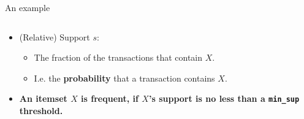 \documentclass[aspectratio=169,t]{beamer}
\begin{document}
{\begin{frame}{An example}
\begin{columns}
\begin{column}{0.5\textwidth}
\begin{itemize}
            \begin{itemize}
              \item Frequency or occurrence of $X$.
            \end{itemize}
            \item (Relative) Support $s$:
            \begin{itemize}
              \item The fraction of the transactions that contain $X$.
              \item I.e. the \textbf{probability} that a transaction contains $X$.
            \end{itemize}
            \item \textbf{An itemset $X$ is frequent, if $X$'s support is no less than a \texttt{min\_sup} threshold.}
          \end{itemize}
          \end{column}
        \end{columns}
    \end{frame}
  }
\end{document}
